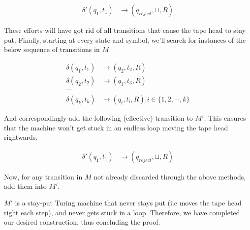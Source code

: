 \documentclass{article}
\begin{document}
\begin{align*}
    \delta'(q_1, t_1) & \rightarrow (q_{reject}, \sqcup, R)
\end{align*}

These efforts will have got rid of all transitions that cause the tape head to stay put. Finally, starting at every state and symbol, we'll search for instances of the below sequence of transitions in $M$

\begin{align*}
    \delta(q_1, t_1)             & \rightarrow (q_2, t_2, R) \\
    \delta(q_2, t_2)             & \rightarrow (q_3, t_3, R) \\
    \cdots \\
    \delta(q_k, t_k)             & \rightarrow (q_i, t_i, R) | i \in \{1, 2, \cdots , k\}
\end{align*}

And correspondingly add the following (effective) transition to $M'$. This ensures that the machine won't get stuck in an endless loop moving the tape head rightwards.

\begin{align*}
    \delta'(q_1, t_1) & \rightarrow (q_{reject}, \sqcup, R)
\end{align*}

Now, for any transition in $M$ not already discarded through the above methods, add them into $M'$.

$M'$ is a stay-put Turing machine that never stays put (i.e moves the tape head right each step), and never gets stuck in a loop. Therefore, we have completed our desired construction, thus concluding the proof.
\end{document}
